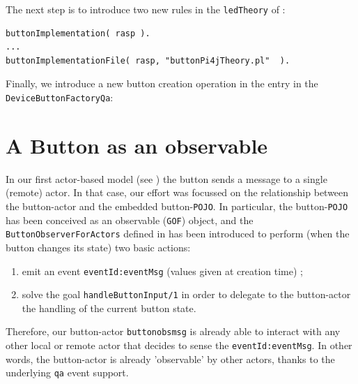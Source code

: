 

The next step is to introduce two new rules in  the \texttt{ledTheory} of :

\begin{lstlisting}
buttonImplementation( rasp ).
...
buttonImplementationFile( rasp, "buttonPi4jTheory.pl"  ).
\end{lstlisting}

 

Finally, we introduce a new button creation operation in the entry in the \texttt{DeviceButtonFactoryQa}:


\newpage 
\section{A Button as an observable}
 
In our first actor-based model (see ) the button sends a message to a single (remote) actor. In that case, our effort was focussed on the relationship between the button-actor and the embedded button-\texttt{POJO}. In particular, the button-\texttt{POJO} has been conceived as an observable (\texttt{GOF}) object, and the \texttt{ButtonObserverForActors} defined in  has been introduced to perform (when the button changes its state) two basic actions:
\begin{enumerate}
\item emit an event \texttt{eventId:eventMsg} (values given at creation time)  ;
\item solve the goal \texttt{handleButtonInput/1} in order to delegate to the button-actor the handling of the current button state.
\end{enumerate}

Therefore, our button-actor \texttt{buttonobsmsg} is already able to interact with any other local or remote actor that decides to sense the \texttt{eventId:eventMsg}.  In other words, the button-actor is already 'observable' by other actors, thanks to the underlying \texttt{qa} event support.

